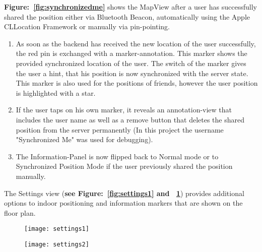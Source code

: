 \textbf{Figure:~\ref{fig:synchronizedme}} shows the MapView after a user has successfully shared the position either via Bluetooth Beacon, automatically using the Apple CLLocation Framework or manually via pin-pointing.


\begin{enumerate}
\item As soon as the backend has received the new location of the user successfully, the red pin is exchanged with a marker-annotation. This marker shows the provided synchronized location of the user. The switch of the marker gives the user a hint, that his position is now synchronized with the server state. This marker is also used for the positions of friends, however the user position is highlighted with a star.
\item If the user taps on his own marker, it reveals an annotation-view that includes the user name as well as a remove button that deletes the shared position from the server permanently (In this project the username "Synchronized Me" was used for debugging).

\item The Information-Panel is now flipped back to Normal mode or to Synchronized Position Mode if the user previously shared the position manually.
\end{enumerate}


The Settings view (\textbf{see Figure:~\ref{fig:settings1} and ~\ref{fig:settings2}}) provides additional options to indoor positioning and information markers that are shown on the floor plan.

\begin{figure}
\centering
\begin{minipage}{.5\textwidth}
  \centering
  \texttt{[image: settings1]}
  \label{fig:settings1}
\end{minipage}%
\begin{minipage}{.5\textwidth}
  \centering
  \texttt{[image: settings2]}
  \label{fig:settings2}
\end{minipage}
\end{figure}

